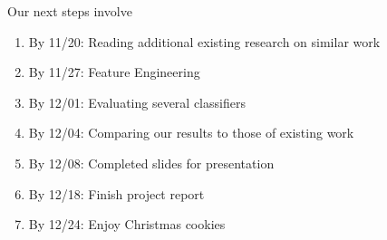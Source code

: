 \documentclass[]{article}
\begin{document}
Our next steps involve

\begin{enumerate}
	\item By 11/20: Reading additional existing research on similar work
	\item By 11/27: Feature Engineering
	\item By 12/01: Evaluating several classifiers
	\item By 12/04: Comparing our results to those of existing work
	\item By 12/08: Completed slides for presentation
	\item By 12/18: Finish project report
	\item By 12/24: Enjoy Christmas cookies
\end{enumerate} 
\end{document}
